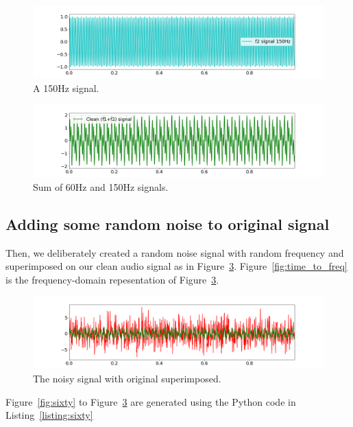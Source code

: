 \documentclass[a4paper, 12pt]{scrartcl}
\begin{document}
\begin{figure}[H] 
  \centering
  \includegraphics[width=\textwidth]{img/signal_150hz.png}
  \caption{A 150Hz signal.}
  \label{fig:onefifty}
\end{figure}

\begin{figure}[H] 
  \centering
  \includegraphics[width=\textwidth]{img/sum_signals.png}
  \caption{Sum of 60Hz and 150Hz signals.}
  \label{fig:sumsignals}
\end{figure}
\subsection{Adding some random noise to original signal}

Then, we deliberately created a random noise signal with random frequency and superimposed on our clean audio signal as in Figure~\ref{fig:original_noisy}. 
Figure~\ref{fig:time_to_freq} is the frequency-domain repesentation of Figure~\ref{fig:original_noisy}.

\begin{figure}[H] 
  \centering
  \includegraphics[width=\textwidth]{img/original_noisy.png}
  \caption{The noisy signal with original superimposed.}
  \label{fig:original_noisy}
\end{figure}

Figure~\ref{fig:sixty} to Figure~\ref{fig:original_noisy} are generated using the Python code in Listing~\ref{listing:sixty}
\end{document}
